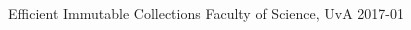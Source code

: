 \begin{multicols}{2}
%
%
%
%
%
%
%
%
%
%
%
%
%

         {Efficient Immutable Collections}
         {Faculty of Science, UvA}
         {2017-01}


\end{multicols}
